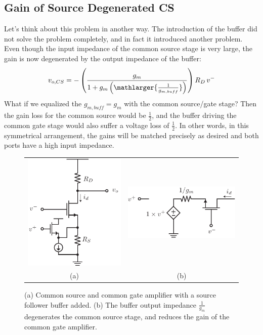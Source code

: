 \subsection{Gain of Source Degenerated CS}
Let's think about this problem in another way.  The introduction of the buffer did not solve the problem completely, and in fact it introduced another problem.  Even though the input impedance of the common source stage is very large, the gain is now degenerated by the output impedance of the buffer:   
    \begin{equation}
        v_{o,CS} = -\left(\frac{g_m}{1 + g_m\left(\mathlarger{\frac{1}{g_{m,buff}}}\right)}\right)R_D\,v^-
    \end{equation}
What if we equalized the $g_{m,buff} = g_m$ with the common source/gate stage?  Then the gain loss for the common source would be $\frac{1}{2}$, and the buffer driving the common gate stage would also suffer a voltage loss of $\frac{1}{2}$.  In other words, in this symmetrical arrangement, the gains will be matched precisely as desired and both ports have a high input impedance.
\newpage
\begin{figure}[t]
\centering
\begin{tabular}{cc}
\includegraphics[scale=1.25]{amp_diff_CS_CG_CD} &
\includegraphics[scale=1.25]{amp_CG_CD_Model}\\
(a) & (b)\\
\end{tabular}
\caption{(a) Common source and common gate amplifier with a source follower buffer added.  (b) The buffer output impedance $\frac{1}{g_m}$ degenerates the common source stage, and reduces the gain of the common gate amplifier.}
\label{fig:amp_diff_CS_CG_CD}
\end{figure}
